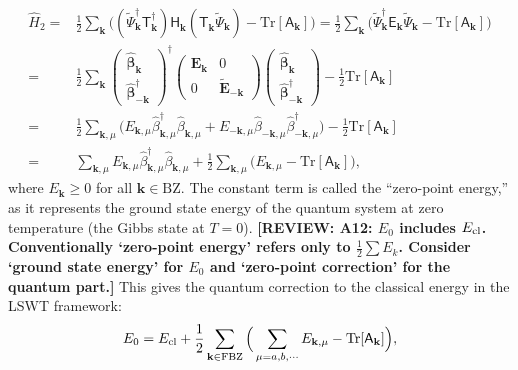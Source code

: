 \documentclass[aps, prx, nofootinbib, superscriptaddress]{revtex4-2}
\newcommand{\REVIEW}[1]{{\color{reviewcolor}\bfseries [REVIEW: #1]}}
\newcommand{\kvec}{\mathbf{k}}
\newcommand{\Tr}{\mathrm{Tr}}
\begin{document}
\begin{align}
    \hat{H}_{2}
    = & \frac{1}{2} \sum_{\kvec} 
    \Big( (\widetilde{\Psi}^{\dagger}_{\kvec} \mathsf{T}_{\kvec}^{\dagger}) \mathsf{H}_{\kvec}^{\phantom \dagger} (\mathsf{T}_{\kvec}^{\phantom \dagger} \widetilde{\Psi}_{\kvec}^{\phantom \dagger} )- \Tr [\mathsf{A}_{\kvec}] \Big) 
    = \frac{1}{2} \sum_{\kvec} 
    \Big( \widetilde{\Psi}^{\dagger}_{\kvec} \mathsf{E}_{\kvec} \widetilde{\Psi}_{\kvec} - \Tr [\mathsf{A}_{\kvec}] \Big) \nonumber \\
    = & \frac{1}{2} \sum_{\kvec} 
    \begin{pmatrix}
        \hat{\bm \beta}_{\kvec} \\
        \hat{\bm \beta}_{-\kvec}^{\dagger}
    \end{pmatrix}^{\dagger}
    \begin{pmatrix}
        \mathbf{E}_{\kvec} & 0 \\ 0 & \widetilde{\mathbf{E}}_{-\kvec}
    \end{pmatrix}
    \begin{pmatrix}
        \hat{\bm \beta}_{\kvec} \\
        \hat{\bm \beta}_{-\kvec}^{\dagger}
    \end{pmatrix} 
    - \frac{1}{2} \Tr [\mathsf{A}_{\kvec}]
    \nonumber \\
    = & \frac{1}{2} \sum_{\kvec, \mu} 
    \big( 
        E_{\kvec, \mu} \hat{\beta}^{\dagger}_{\kvec, \mu}   \hat{\beta}^{\phantom \dagger}_{\kvec, \mu} +
        E_{-\kvec, \mu} \hat{\beta}^{\phantom \dagger}_{-\kvec, \mu} \hat{\beta}^{\dagger}_{-\kvec, \mu}
    \big) 
    - \frac{1}{2} \Tr [\mathsf{A}_{\kvec}] \\
    = & \sum_{\kvec, \mu} E_{\kvec, \mu} \hat{\beta}_{\kvec, \mu}^{\dagger} \hat{\beta}_{\kvec, \mu}^{\phantom \dagger} 
    + \frac{1}{2} \sum_{\kvec, \mu} \big( E_{\kvec, \mu} - \Tr [\mathsf{A}_{\kvec}] \big),
\end{align}
where $E_{\kvec} \ge 0$ for all $\kvec \in \mathrm{BZ}$. 
The constant term is called the ``zero-point energy,'' as it represents the ground state energy of the quantum system at zero temperature (the Gibbs state at $T=0$).
\REVIEW{A12: $E_0$ includes $E_{\rm cl}$. Conventionally `zero-point energy' refers only to $\frac{1}{2}\sum E_k$. Consider `ground state energy' for $E_0$ and `zero-point correction' for the quantum part.}
This gives the quantum correction to the classical energy in the LSWT framework:
\begin{equation}\label{eq: def. of zero point energy}
    E_{0} = E_{\rm cl} + \frac{1}{2} \sum_{\kvec \in \mathrm{FBZ}} \Big( \sum_{\mu=a,b,\cdots} E_{\kvec, \mu} -  \Tr[\mathsf{A}_{\kvec}] \Big),
\end{equation}
\end{document}
